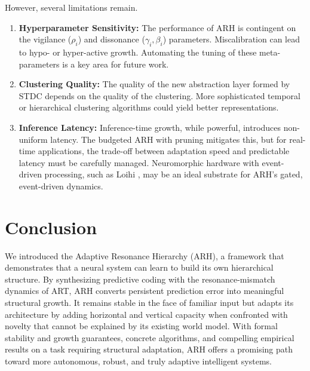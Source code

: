 \documentclass{article}
\begin{document}
However, several limitations remain.
\begin{enumerate}
    \item \textbf{Hyperparameter Sensitivity:} The performance of ARH is contingent on the vigilance ($\rho_i$) and dissonance ($\gamma_i, \beta_i$) parameters. Miscalibration can lead to hypo- or hyper-active growth. Automating the tuning of these meta-parameters is a key area for future work.
    \item \textbf{Clustering Quality:} The quality of the new abstraction layer formed by STDC depends on the quality of the clustering. More sophisticated temporal or hierarchical clustering algorithms could yield better representations.
    \item \textbf{Inference Latency:} Inference-time growth, while powerful, introduces non-uniform latency. The budgeted ARH with pruning mitigates this, but for real-time applications, the trade-off between adaptation speed and predictable latency must be carefully managed. Neuromorphic hardware with event-driven processing, such as Loihi \citep{loihi2018}, may be an ideal substrate for ARH's gated, event-driven dynamics.
\end{enumerate}

\section{Conclusion}
We introduced the Adaptive Resonance Hierarchy (ARH), a framework that demonstrates that a neural system can learn to build its own hierarchical structure. By synthesizing predictive coding with the resonance-mismatch dynamics of ART, ARH converts persistent prediction error into meaningful structural growth. It remains stable in the face of familiar input but adapts its architecture by adding horizontal and vertical capacity when confronted with novelty that cannot be explained by its existing world model. With formal stability and growth guarantees, concrete algorithms, and compelling empirical results on a task requiring structural adaptation, ARH offers a promising path toward more autonomous, robust, and truly adaptive intelligent systems.



\end{document}
